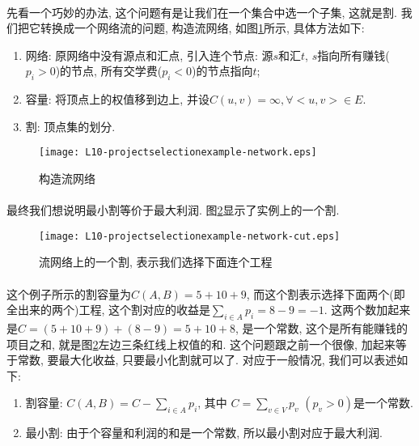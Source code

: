 \documentclass[a4paper]{article}
\renewcommand{\figurename}{图}
\begin{document}
            \paragraph{}先看一个巧妙的办法, 这个问题有是让我们在一个集合中选一个子集, 这就是割. 我们把它转换成一个网络流的问题, 构造流网络, 如\figurename\ref{Figure: project_selection_example_network}所示, 具体方法如下:
            \begin{enumerate}
 \item 网络: 原网络中没有源点和汇点, 引入连个节点: 源$s$和汇$t$, $s$指向所有赚钱($p_i > 0$)的节点, 所有交学费($p_i < 0$)的节点指向$t$;
 \item 容量: 将顶点上的权值移到边上, 并设$C(u,v)=\infty , \forall <u,v>\in E$.
 \item 割: 顶点集的划分.
            \end{enumerate}
            \begin{figure}[h]
                \centering
                \texttt{[image: L10-projectselectionexample-network.eps]}
                \caption{构造流网络}
                \label{Figure: project_selection_example_network}
            \end{figure}

            \paragraph{}最终我们想说明最小割等价于最大利润. \figurename\ref{Figure: project_selection_example_network_cut}显示了实例上的一个割.
            \begin{figure}[h]
                \centering
                \texttt{[image: L10-projectselectionexample-network-cut.eps]}
                \caption{流网络上的一个割, 表示我们选择下面连个工程}
                \label{Figure: project_selection_example_network_cut}
            \end{figure}
            \paragraph{}这个例子所示的割容量为$C(A,B) = 5 + 10 + 9$, 而这个割表示选择下面两个(即全出来的两个)工程, 这个割对应的收益是$ \sum_{i \in A} p_i = 8 - 9 = -1 $. 这两个数加起来是$C = (5 + 10 + 9) + (8 - 9) = 5 + 10 + 8$, 是一个常数, 这个是所有能赚钱的项目之和, 就是\figurename\ref{Figure: project_selection_example_network_cut}左边三条红线上权值的和. 这个问题跟之前一个很像, 加起来等于常数, 要最大化收益, 只要最小化割就可以了. 对应于一般情况, 我们可以表述如下:
            \begin{enumerate}
 \item 割容量: $C(A,B) = C - \sum_{i \in A} p_i$, 其中 $C=\sum_{v\in V} p_v $ $(p_v > 0)$是一个常数.
  \item 最小割: 由于个容量和利润的和是一个常数, 所以最小割对应于最大利润.
            \end{enumerate}
\end{document}
